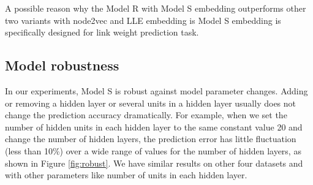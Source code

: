 \documentclass{article} %
\begin{document}
A possible reason why the Model R with Model S embedding outperforms other two variants with node2vec and LLE embedding is Model S embedding is specifically designed for link weight prediction task.

\subsection{Model robustness}
In our experiments, Model S is robust against model parameter changes. Adding or removing a hidden layer or several units in a hidden layer usually does not change the prediction accuracy dramatically.
For example, when we set the number of hidden units in each hidden layer to the same constant value 20 and change the number of hidden layers,
the prediction error has little fluctuation (less than 10\%) over a wide range of values for the number of hidden layers,
as shown in Figure \ref{fig:robust}.
We have similar results on other four datasets and with other parameters like number of units in each hidden layer.
\end{document}
